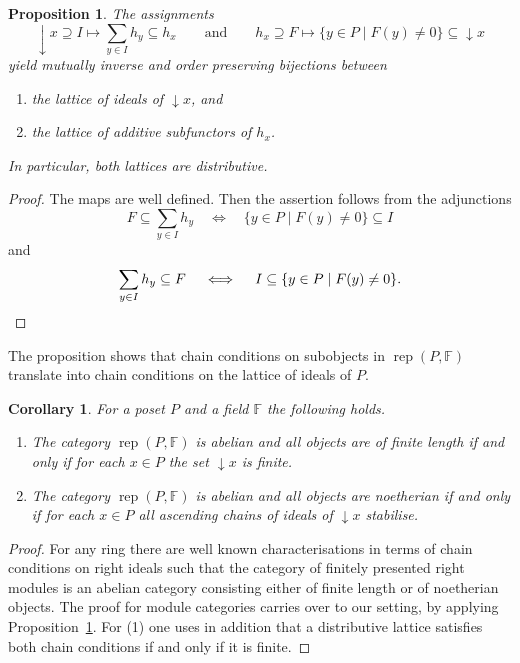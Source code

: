 \documentclass[a4paper]{amsart}
\theoremstyle{plain}
\newtheorem{prop}[thm]{Proposition}
\newtheorem{cor}[thm]{Corollary}
\theoremstyle{definition}
\theoremstyle{remark}
\numberwithin{equation}{section}
\newcommand{\rep}{\operatorname{rep}}
\def\bbF{\mathbb F}
\begin{document}
\begin{prop}\label{pr:subobj}
  The assignments
\[\downarrow\! x\supseteq I\mapsto \sum_{y\in
    I}h_y\subseteq h_x\qquad\text{and}\qquad
  h_x\supseteq F\mapsto \{y\in P\mid
F(y)\neq 0\}\subseteq {\downarrow\! x}
\]
yield mutually inverse and order preserving bijections between
\begin{enumerate}
\item the lattice of ideals of
  $\downarrow\! x$, and
\item the lattice of additive subfunctors of $h_x$.
\end{enumerate}
  In particular, both lattices are distributive. 
\end{prop}
\begin{proof}
  The maps are well defined. Then the assertion follows from the adjunctions
  \[F\subseteq \sum_{y\in
    I}h_y\quad\iff\quad \{y\in P\mid
  F(y)\neq 0\}\subseteq I\] and
  \[\sum_{y\in
    I}h_y\subseteq F\quad\iff\quad I\subseteq \{y\in P\mid
  F(y)\neq 0\}.\qedhere\]
\end{proof}

The proposition shows that chain conditions on subobjects in $\rep(P,\bbF)$
translate into chain conditions on the lattice of ideals of $P$.

\begin{cor}\label{co:subobj}
For a poset $P$ and a field $\bbF$ the following holds.
\begin{enumerate}
\item The category $\rep(P,\bbF)$ is abelian and all objects are of finite length if
and only if  for each $x\in P$ the set $\downarrow\! x$ is finite.
\item The category $\rep(P,\bbF)$ is abelian and all objects are noetherian if
and only if for each $x\in P$ all ascending chains of ideals of $\downarrow\! x$ stabilise.
\end{enumerate}  
\end{cor}
\begin{proof}
  For any ring there are well known characterisations in terms of
  chain conditions on right ideals such that the category
  of finitely presented right modules is an abelian
  category consisting either of finite length or of noetherian
  objects. The proof for module categories carries over to our
  setting, by applying
  Proposition~\ref{pr:subobj}. For (1) one uses in addition that a distributive
  lattice satisfies both chain conditions if and only if it is finite.
\end{proof}
\end{document}
